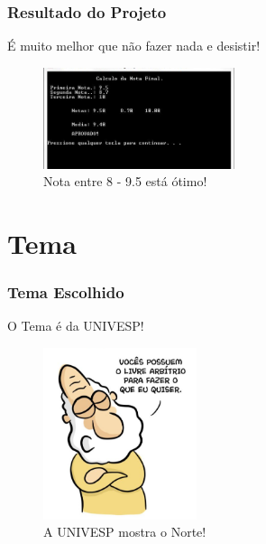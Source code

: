 \documentclass{beamer}
\begin{document}
\begin{frame}
  \frametitle{Resultado do Projeto}
  \begin{block}{}
    \begin{center}
      É muito melhor que não fazer nada e desistir!
    \end{center}
    \begin{figure}
      \centering
      \includegraphics[width=0.5\textwidth]{nota9.jpg} %
      \captionsetup{labelformat=simple, labelsep=period}
      \caption{Nota entre 8 - 9.5 está ótimo!}
    \end{figure}
  \end{block}
\end{frame}


\section{Tema}
\begin{frame}
  \frametitle{Tema Escolhido}
  \begin{block}{}
    O Tema é da UNIVESP!
    \begin{figure}
      \centering
      \includegraphics[width=0.4\textwidth]{univesp_tema_pi.png} %
      \captionsetup{labelformat=simple, labelsep=period}
      \caption{A UNIVESP mostra o Norte!}
    \end{figure}
  \end{block}
\end{frame}
\end{document}
